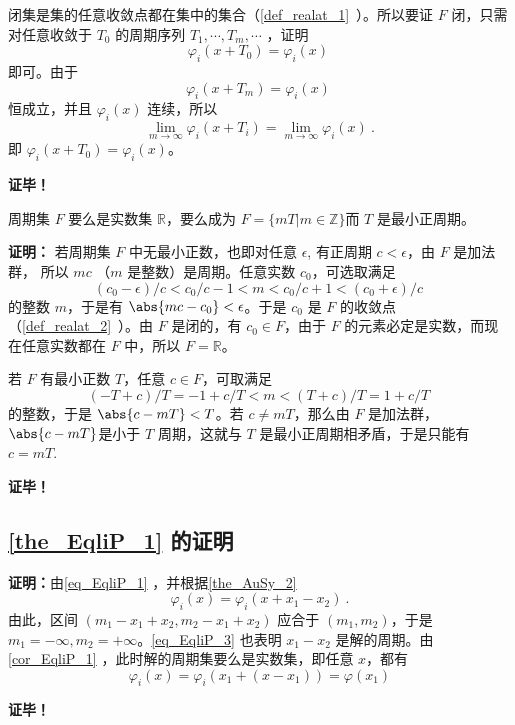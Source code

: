 闭集是集的任意收敛点都在集中的集合（\autoref{def_realat_1}~）。所以要证 $F$ 闭，只需对任意收敛于 $T_0$ 的周期序列 $T_1,\cdots, T_m,\cdots$ ，证明
\begin{equation}
\varphi_i(x+T_0)=\varphi_i(x)~
\end{equation}
即可。由于
\begin{equation}
\varphi_i(x+T_m)=\varphi_i(x)~
\end{equation}
恒成立，并且 $\varphi_i(x)$ 连续，所以
\begin{equation}
\lim_{m\rightarrow\infty}\varphi_i(x+T_i)=\lim_{m\rightarrow\infty}\varphi_i(x)~.
\end{equation}
即 $\varphi_i(x+T_0)=\varphi_i(x)$。

\textbf{证毕！}
\begin{corollary}{}\label{cor_EqliP_1}
周期集 $F$ 要么是实数集 $\mathbb R$，要么成为 $F=\{mT|m\in\mathbb Z\}$而 $T$ 是最小正周期。
\end{corollary}
\textbf{证明：}
若周期集 $F$ 中无最小正数，也即对任意 $\epsilon$, 有正周期 $c<\epsilon$，由 $F$ 是加法群， 所以 $mc$ （$m$ 是整数）是周期。任意实数 $c_0$，可选取满足
\begin{equation}
(c_0-\epsilon)/c<c_0/c-1<m<c_0/c+1<(c_0+\epsilon)/c~
\end{equation}
的整数 $m$，于是有 $\abs{mc-c_0}<\epsilon$。于是 $c_0$ 是 $F$ 的收敛点（\autoref{def_realat_2}~）。由 $F$ 是闭的，有 $c_0\in F$，由于 $F$ 的元素必定是实数，而现在任意实数都在 $F$ 中，所以 $F=\mathbb R$。

若 $F$ 有最小正数 $T$，任意 $c\in F$，可取满足
\begin{equation}
(-T+c)/T=-1+c/T<m<(T+c)/T=1+c/T~
\end{equation}
的整数，于是 $\abs{c-mT}<T$。若 $c\neq mT$，那么由 $F$ 是加法群， $\abs{c-mT}$是小于 $T$ 周期，这就与 $T$ 是最小正周期相矛盾，于是只能有 $c=mT$. 

\textbf{证毕！}

\subsection{\autoref{the_EqliP_1} 的证明}

\textbf{证明：}由\autoref{eq_EqliP_1} ，并根据\autoref{the_AuSy_2}~
\begin{equation}\label{eq_EqliP_3}
\varphi_i(x)=\varphi_i(x+x_1-x_2)~.
\end{equation}
由此，区间 $(m_1-x_1+x_2,m_2-x_1+x_2)$ 应合于 $(m_1,m_2)$，于是 $m_1=-\infty,m_2=+\infty$。\autoref{eq_EqliP_3} 也表明 $x_1-x_2$ 是解的周期。由\autoref{cor_EqliP_1} ，此时解的周期集要么是实数集，即任意 $x$，都有
\begin{equation}
\varphi_i(x)=\varphi_i(x_1+(x-x_1))=\varphi(x_1)
\end{equation}




\textbf{证毕！}












